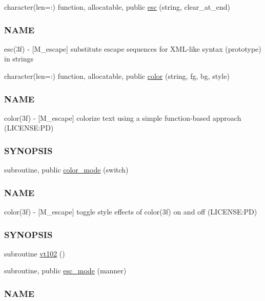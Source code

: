 \begin{DoxyCompactItemize}
\item 
character(len=\+:) function, allocatable, public \mbox{\hyperlink{namespacem__escape_a36f016baad6b23f86189e6f3ee6db0cb}{esc}} (string, clear\+\_\+at\+\_\+end)
\begin{DoxyCompactList}\small\item\em \subsubsection*{N\+A\+ME}

esc(3f) -\/ \mbox{[}M\+\_\+escape\mbox{]} substitute escape sequences for X\+M\+L-\/like syntax (prototype) in strings \end{DoxyCompactList}\item 
character(len=\+:) function, allocatable, public \mbox{\hyperlink{namespacem__escape_af7d28a73e65efb58beeb684d7bdeefec}{color}} (string, fg, bg, style)
\begin{DoxyCompactList}\small\item\em \subsubsection*{N\+A\+ME}

color(3f) -\/ \mbox{[}M\+\_\+escape\mbox{]} colorize text using a simple function-\/based approach (L\+I\+C\+E\+N\+SE\+:PD) \subsubsection*{S\+Y\+N\+O\+P\+S\+IS}\end{DoxyCompactList}\item 
subroutine, public \mbox{\hyperlink{namespacem__escape_a24566737cb6aa1672180eaa21c8d4f66}{color\+\_\+mode}} (switch)
\begin{DoxyCompactList}\small\item\em \subsubsection*{N\+A\+ME}

color(3f) -\/ \mbox{[}M\+\_\+escape\mbox{]} toggle style effects of color(3f) on and off (L\+I\+C\+E\+N\+SE\+:PD) \subsubsection*{S\+Y\+N\+O\+P\+S\+IS}\end{DoxyCompactList}\item 
subroutine \mbox{\hyperlink{namespacem__escape_ae9d40717b2e75e90e2505d5fed6435c5}{vt102}} ()
\item 
subroutine, public \mbox{\hyperlink{namespacem__escape_a4210456d81d9a1bf328093a9635e640b}{esc\+\_\+mode}} (manner)
\begin{DoxyCompactList}\small\item\em \subsubsection*{N\+A\+ME}


\end{DoxyCompactList}
\end{DoxyCompactItemize}

